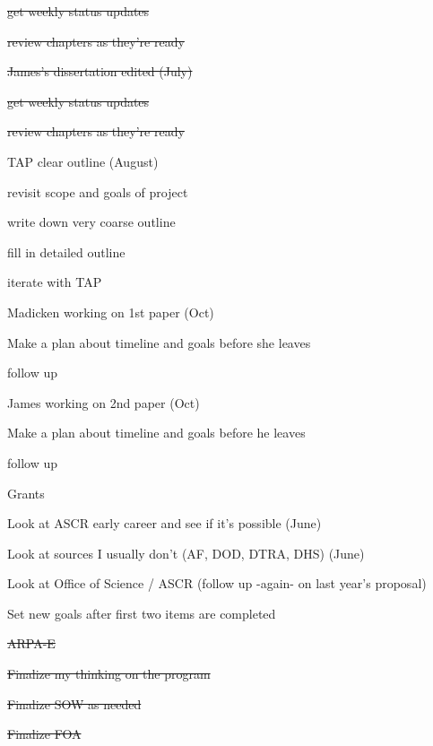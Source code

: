 \documentclass[12pt,twoside]{article}
\begin{document}
\begin{compactitem}
\begin{compactitem}
\begin{compactitem}
     \item \st{get weekly status updates}
     \item \st{review chapters as they're ready}
     \end{compactitem}
  \item \st{James's dissertation edited (July)}
     \begin{compactitem}
     \item \st{get weekly status updates}
     \item \st{review chapters as they're ready}
     \end{compactitem}
  \item TAP clear outline (August)
     \begin{compactitem}
     \item revisit scope and goals of project
     \item write down very coarse outline
     \item fill in detailed outline
     \item iterate with TAP
     \end{compactitem}
  \item Madicken working on 1st paper (Oct)
     \begin{compactitem}
     \item Make a plan about timeline and goals before she leaves
     \item follow up
     \end{compactitem}
  \item James working on 2nd paper (Oct)
     \begin{compactitem}
     \item Make a plan about timeline and goals before he leaves
     \item follow up
     \end{compactitem}
  \end{compactitem}

\item Grants
  \begin{compactitem}
  \item Look at ASCR early career and see if it's possible (June)
  \item Look at sources I usually don't (AF, DOD, DTRA, DHS) (June)
  \item Look at Office of Science / ASCR (follow up -again- on last year's proposal)
  \item Set new goals after first two items are completed
  \end{compactitem}
 
\item \st{ARPA-E}
  \begin{compactitem}
  \item \st{Finalize my thinking on the program}
  \item \st{Finalize SOW as needed}
  \item \st{Finalize FOA}
  \end{compactitem}
\end{compactitem}
\end{document}

